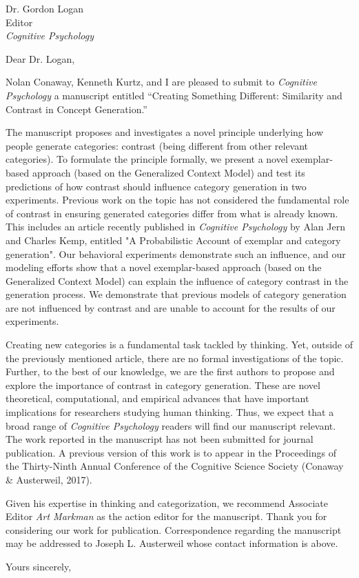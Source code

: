 \documentclass{letter}
\begin{document}
\date{June 17 2017}
\begin{letter}{Dr. Gordon Logan \\ Editor \\ {\em Cognitive Psychology}}

\vspace{30mm}

\opening{Dear Dr. Logan,}


Nolan Conaway, Kenneth Kurtz, and I are pleased to submit to {\em Cognitive Psychology} a manuscript entitled ``Creating Something Different: Similarity and Contrast in Concept Generation.''

The manuscript proposes and investigates a novel principle underlying how people generate categories: contrast (being different from other relevant categories). To formulate the principle formally, we present a novel exemplar-based approach (based on the Generalized Context Model) and test its predictions of how contrast should influence category generation in two experiments. Previous work on the topic has not considered the fundamental role of contrast in ensuring generated categories differ from what is already known. This includes an article recently published in {\em Cognitive Psychology} by Alan Jern and Charles Kemp, entitled "A Probabilistic Account of exemplar and category generation". Our behavioral experiments demonstrate such an influence, and our modeling efforts show that a novel exemplar-based approach (based on the Generalized Context Model) can explain the influence of category contrast in the generation process. We demonstrate that previous models of category generation are not influenced by contrast and are unable to account for the results of our experiments.

Creating new categories is a fundamental task tackled by thinking. Yet, outside of the previously mentioned article, there are no formal investigations of the topic. Further, to the best of our knowledge, we are the first authors to propose and explore the importance of contrast in category generation. These are novel theoretical, computational, and empirical advances that have important implications for researchers studying human thinking. Thus, we expect that a broad range of {\em Cognitive Psychology} readers will find our manuscript relevant. The work reported in the manuscript has not been submitted for journal publication. A previous version of this work is to appear in the Proceedings of the Thirty-Ninth Annual Conference of the Cognitive Science Society (Conaway \& Austerweil, 2017).

Given his expertise in thinking and categorization, we recommend Associate Editor {\em Art Markman} as the action editor for the manuscript. Thank you for considering our work for publication. Correspondence regarding the manuscript may be addressed to Joseph L. Austerweil whose contact information is above.

\closing{Yours sincerely,}

\end{letter}
\end{document}
